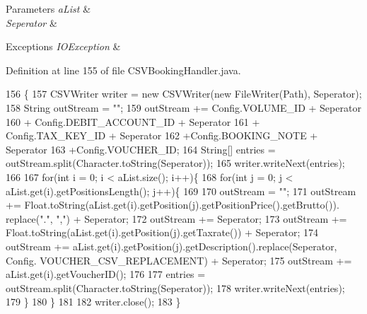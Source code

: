 \begin{DoxyParams}{Parameters}
{\em a\+List} & \\
\hline
{\em Seperator} & \\
\hline
\end{DoxyParams}

\begin{DoxyExceptions}{Exceptions}
{\em I\+O\+Exception} & \\
\hline
\end{DoxyExceptions}


Definition at line 155 of file C\+S\+V\+Booking\+Handler.\+java.


\begin{DoxyCode}
156     \{
157         CSVWriter writer = \textcolor{keyword}{new} CSVWriter(\textcolor{keyword}{new} FileWriter(Path), Seperator);
158         String outStream = \textcolor{stringliteral}{""};
159         outStream += Config.VOLUME\_ID + Seperator
160                 + Config.DEBIT\_ACCOUNT\_ID + Seperator
161                 + Config.TAX\_KEY\_ID + Seperator
162                 +Config.BOOKING\_NOTE + Seperator
163                 +Config.VOUCHER\_ID;
164         String[] entries = outStream.split(Character.toString(Seperator));
165         writer.writeNext(entries);
166         
167         \textcolor{keywordflow}{for}(\textcolor{keywordtype}{int} i = 0; i < aList.size(); i++)\{
168             \textcolor{keywordflow}{for}(\textcolor{keywordtype}{int} j = 0; j < aList.get(i).getPositionsLength(); j++)\{
169                 
170                 outStream = \textcolor{stringliteral}{""};
171                 outStream += Float.toString(aList.get(i).getPosition(j).getPositionPrice().getBrutto()).
      replace(\textcolor{stringliteral}{"."}, \textcolor{stringliteral}{","}) + Seperator;
172                 outStream += Seperator;
173                 outStream += Float.toString(aList.get(i).getPosition(j).getTaxrate()) + Seperator;
174                 outStream += aList.get(i).getPosition(j).getDescription().replace(Seperator, Config.
      VOUCHER\_CSV\_REPLACEMENT) + Seperator;
175                 outStream += aList.get(i).getVoucherID();
176                 
177                 entries = outStream.split(Character.toString(Seperator));
178                 writer.writeNext(entries);
179             \}
180         \}
181         
182         writer.close();
183     \}
\end{DoxyCode}
